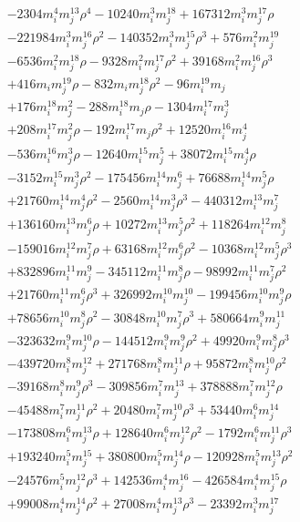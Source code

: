 {\begin{align*}
&-2304m_i^{4}m_j^{13}\rho^{4}-10240m_i^{3}m_j^{18}+167312m_i^{3}m_j^{17}\rho\\
&-221984m_i^{3}m_j^{16}\rho^{2}-140352m_i^{3}m_j^{15}\rho^{3}+576m_i^{2}m_j^{19}\\
&-6536m_i^{2}m_j^{18}\rho-9328m_i^{2}m_j^{17}\rho^{2}+39168m_i^{2}m_j^{16}\rho^{3}\\
&+416m_im_j^{19}\rho-832m_im_j^{18}\rho^{2}-96m_i^{19}m_j\\
&+176m_i^{18}m_j^{2}-288m_i^{18}m_j\rho-1304m_i^{17}m_j^{3}\\
&+208m_i^{17}m_j^{2}\rho-192m_i^{17}m_j\rho^{2}+12520m_i^{16}m_j^{4}\\
&-536m_i^{16}m_j^{3}\rho-12640m_i^{15}m_j^{5}+38072m_i^{15}m_j^{4}\rho\\
&-3152m_i^{15}m_j^{3}\rho^{2}-175456m_i^{14}m_j^{6}+76688m_i^{14}m_j^{5}\rho\\
&+21760m_i^{14}m_j^{4}\rho^{2}-2560m_i^{14}m_j^{3}\rho^{3}-440312m_i^{13}m_j^{7}\\
&+136160m_i^{13}m_j^{6}\rho+10272m_i^{13}m_j^{5}\rho^{2}+118264m_i^{12}m_j^{8}\\
&-159016m_i^{12}m_j^{7}\rho+63168m_i^{12}m_j^{6}\rho^{2}-10368m_i^{12}m_j^{5}\rho^{3}\\
&+832896m_i^{11}m_j^{9}-345112m_i^{11}m_j^{8}\rho-98992m_i^{11}m_j^{7}\rho^{2}\\
&+21760m_i^{11}m_j^{6}\rho^{3}+326992m_i^{10}m_j^{10}-199456m_i^{10}m_j^{9}\rho\\
&+78656m_i^{10}m_j^{8}\rho^{2}-30848m_i^{10}m_j^{7}\rho^{3}+580664m_i^{9}m_j^{11}\\
&-323632m_i^{9}m_j^{10}\rho-144512m_i^{9}m_j^{9}\rho^{2}+49920m_i^{9}m_j^{8}\rho^{3}\\
&-439720m_i^{8}m_j^{12}+271768m_i^{8}m_j^{11}\rho+95872m_i^{8}m_j^{10}\rho^{2}\\
&-39168m_i^{8}m_j^{9}\rho^{3}-309856m_i^{7}m_j^{13}+378888m_i^{7}m_j^{12}\rho\\
&-45488m_i^{7}m_j^{11}\rho^{2}+20480m_i^{7}m_j^{10}\rho^{3}+53440m_i^{6}m_j^{14}\\
&-173808m_i^{6}m_j^{13}\rho+128640m_i^{6}m_j^{12}\rho^{2}-1792m_i^{6}m_j^{11}\rho^{3}\\
&+193240m_i^{5}m_j^{15}+380800m_i^{5}m_j^{14}\rho-120928m_i^{5}m_j^{13}\rho^{2}\\
&-24576m_i^{5}m_j^{12}\rho^{3}+142536m_i^{4}m_j^{16}-426584m_i^{4}m_j^{15}\rho\\
&+99008m_i^{4}m_j^{14}\rho^{2}+27008m_i^{4}m_j^{13}\rho^{3}-23392m_i^{3}m_j^{17}\\

\end{align*}}

